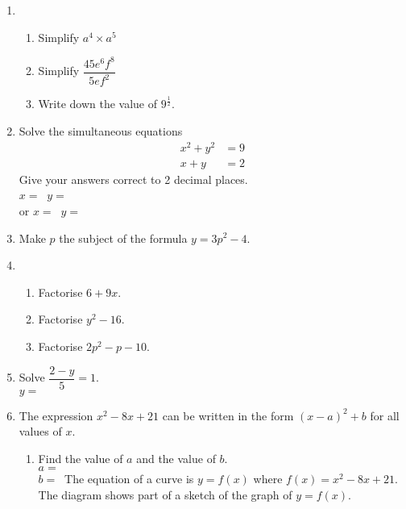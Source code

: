 \begin{enumerate}
  \item %
  \begin{enumerate}
    \item Simplify $a^4\times a^5$\strch
    \item Simplify $\dfrac{45e^6f^8}{5ef^2}$\strch
    \item Write down the value of $9^{\frac{1}{2}}$.\strch
  \end{enumerate}
  \newpage
  \item Solve the simultaneous equations
  \begin{align*}
    x^2 + y^2 &= 9\\
    x + y &= 2
  \end{align*}
  Give your answers correct to 2 decimal places.\strch\\
  \vspace*{0pt}\hfill$x =\ $\dline\hspace{0.2cm} $y =\ $\dline\\
  \vspace*{0pt}\hfill or $x =\ $\dline\hspace{0.2cm} $y =\ $\dline
  \item Make $p$ the subject of the formula $y = 3p^2 - 4$.\strch
  \item %
  \begin{enumerate}
    \item Factorise	$6 + 9x$.\strch
    \item Factorise	$y^2 - 16$.\strch
    \item Factorise	$2p^2 - p - 10$.\strch
  \end{enumerate}
  \newpage
  \item Solve $\dfrac{2 - y}{5} = 1$.\strch\\\vspace*{0pt}\hfill $y =\ $\dline
  \item The expression $x^2 - 8x + 21$ can be written in the form $(x - a)^2 + b$ for all values of $x$.
  \begin{enumerate}
    \item Find the value of $a$ and the value of $b$.\strch\\
    \vspace*{0pt}\hfill $a =\ $\dline\\
    \vspace*{0pt}\hfill $b =\ $\dline
    The equation of a curve is $y = f(x)$ where $f(x) = x^2 - 8x + 21$. The diagram shows part of a sketch of the graph of $y = f(x)$.

\end{enumerate}
\end{enumerate}
